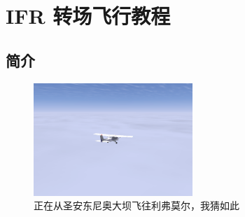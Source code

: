 

%
%
%
%
%
%
%








\chapter{IFR 转场飞行教程}
\label{IFR Tutorial}

\section{简介}

\begin{figure}[h]
  \begin{center}
    \includegraphics[width=6cm]{img/somewhere}
    \caption{正在从圣安东尼奥大坝飞往利弗莫尔，我猜如此}
    \label{fig:somewhere}
  \end{center}
\end{figure}

